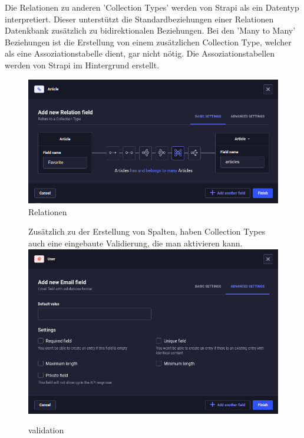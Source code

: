 Die Relationen zu anderen 'Collection Types' werden von Strapi als ein Datentyp interpretiert.
Dieser unterstützt die Standardbeziehungen einer Relationen Datenkbank zusätzlich zu bidirektionalen Beziehungen.
Bei den 'Many to Many' Beziehungen ist die Erstellung von einem zusätzlichen Collection Type, welcher als eine Assoziationstabelle dient, gar nicht nötig.
Die Assoziationstabellen werden von Strapi im Hintergrund erstellt.

\begin{figure}[H]
  \centering
  \includegraphics[width=\textwidth]{./pics/relations}
  \caption{Relationen}
  \label{relations}
\end{figure}


\begin{figure}

  Zusätzlich zu der Erstellung von Spalten, haben Collection Types auch eine eingebaute Validierung, die man aktivieren kann.
  \centering
  \includegraphics[width=\textwidth]{./pics/validation.png}
  \caption{validation}
  \label{validation}

\end{figure}

